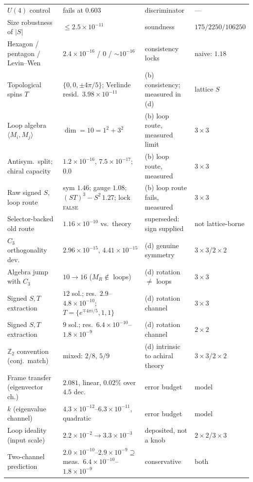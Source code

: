 \documentclass[aps,pra,twocolumn,superscriptaddress,longbibliography,floatfix,nofootinbib]{revtex4-2}
\begin{document}
\begin{table}[tp]
\begin{ruledtabular}
\begin{tabular}{llll}
$U(4)$ control & fails at $0.603$ & discriminator & --- \\
Size robustness of $|S|$ & $\le2.5\times10^{-11}$ & soundness & $175/2250/106250$ \\
Hexagon / pentagon / Levin--Wen & $2.4\times10^{-16}$ / $0$ / ${\sim}10^{-16}$ & consistency locks & naive: $1.18$ \\
\colrule
Topological spins $T$ & $\{0,0,\pm4\pi/5\}$; Verlinde resid.\ $3.98\times10^{-11}$ & (b) consistency; measured in (d) & lattice $S$ \\
Loop algebra $\langle M_i,M_j\rangle$ & $\dim=10=1^{2}+3^{2}$ & (b) loop route, measured limit & $3\times3$ \\
Antisym.\ split; chiral capacity & $1.2\times10^{-16}$, $7.5\times10^{-17}$; $0.0$ & (b) loop route, measured & $3\times3$ \\
Raw signed $S$, loop route & sym $1.46$; gauge $1.08$; $(ST)^{3}{-}S^{2}\,1.27$; lock \textsc{false} & (b) loop route fails, measured & $3\times3$ \\
Selector-backed old route & $1.16\times10^{-10}$ vs.\ theory & superseded: sign supplied & not lattice-borne \\
\colrule
$C_3$ orthogonality dev. & $2.96\times10^{-15}$, $4.41\times10^{-15}$ & (d) genuine symmetry & $3\times3$/$2\times2$ \\
Algebra jump with $C_3$ & $10\to16$ ($M_R\notin$ loops) & (d) rotation $\ne$ loops & $3\times3$ \\
Signed $S,T$ extraction & $12$ sol.; res.\ $2.9$--$4.8{\times}10^{-10}$; $T{=}\{e^{\mp4\pi i/5},1,1\}$ & (d) rotation channel & $3\times3$ \\
Signed $S,T$ extraction & $9$ sol.; res.\ $6.4{\times}10^{-10}$--$1.8{\times}10^{-9}$ & (d) rotation channel & $2\times2$ \\
$\mathbb{Z}_2$ convention (conj.\ match) & mixed: $2/8$, $5/9$ & (d) intrinsic to achiral theory & $3\times3$/$2\times2$ \\
\colrule
Frame transfer (eigenvector ch.) & $2.081$, linear, $0.02\%$ over $4.5$ dec. & error budget & model \\
$k$ (eigenvalue channel) & $4.3\times10^{-12}$--$6.3\times10^{-11}$, quadratic & error budget & model \\
Loop ideality (input scale) & $2.2\times10^{-2}\to3.3\times10^{-3}$ & deposited, not a knob & $2\times2$/$3\times3$ \\
Two-channel prediction & $2.0{\times}10^{-10}$--$2.9{\times}10^{-9}\supseteq$ meas.\ $6.4{\times}10^{-10}$--$1.8{\times}10^{-9}$ & conservative & both \\
\end{tabular}
\end{ruledtabular}
\end{table}
\end{document}
